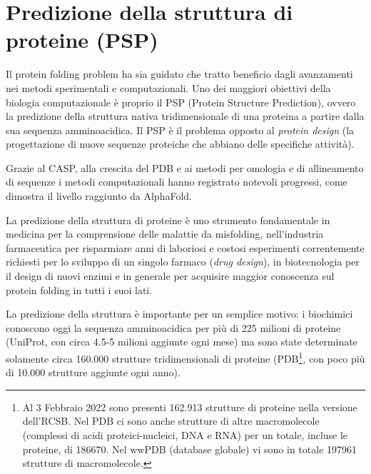\chapter{Predizione della struttura di proteine (PSP)}

Il protein folding problem ha sia guidato che tratto beneficio dagli avanzamenti nei metodi sperimentali e computazionali\supercite{dill2008protein}. Uno dei maggiori obiettivi della biologia computazionale è proprio il PSP (Protein Structure Prediction), ovvero la predizione della struttura nativa tridimensionale di una proteina a partire dalla sua sequenza amminoacidica. Il PSP è il problema opposto al \textit{protein design} (la progettazione di nuove sequenze proteiche che abbiano delle specifiche attività).

\par Grazie al CASP, alla crescita del PDB e ai metodi per omologia e di allineamento di sequenze i metodi computazionali hanno registrato notevoli progressi, come dimostra il livello raggiunto da AlphaFold. 

\par La predizione della struttura di proteine è uno strumento fondamentale in medicina per la comprensione delle malattie da misfolding, nell'industria farmaceutica per risparmiare anni di laboriosi e costosi esperimenti correntemente richiesti per lo sviluppo di un singolo farmaco (\textit{drug design}), in biotecnologia per il design di nuovi enzimi e in generale per acquisire maggior conoscenza sul protein folding in tutti i suoi lati.

\par La predizione della struttura è importante per un semplice motivo: i biochimici conoscono oggi la sequenza amminoacidica per più di 225 milioni di proteine\supercite{proteienDBentries} (UniProt, con circa 4.5-5 milioni aggiunte ogni mese) ma sono state determinate solamente circa 160.000 strutture tridimensionali di proteine\supercite{proteienDBentries} (PDB\footnote{Al 3 Febbraio 2022 sono presenti 162.913 strutture di proteine nella versione dell'RCSB. Nel PDB ci sono anche strutture di altre macromolecole (complessi di acidi proteici-nucleici, DNA e RNA) per un totale, incluse le proteine, di 186670\supercite{pdbStats}. Nel wwPDB (database globale) vi sono in totale 197961 strutture di macromolecole\supercite{wwpdbStats}.}, con poco più di 10.000 strutture aggiunte ogni anno). 

